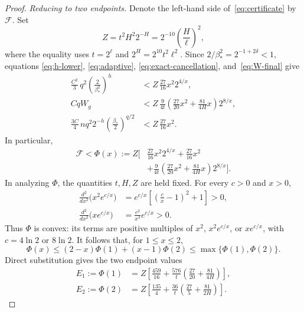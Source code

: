 \documentclass[11pt,a4paper]{article}
\begin{document}
\begin{proof}
\emph{Reducing to two endpoints.}
Denote the left-hand side of~\eqref{eq:certificate} by $\mathcal F$.
Set
\begin{equation}\label{eq:Z}
 Z=t^2H^2 2^{-H}
   =2^{-10}\left(\frac H\ell\right)^2,
\end{equation}
where the equality uses $t=2^\ell$ and
$2^H=2^{10}t^2\ell^2$.
Since $2/\beta_*^2=2^{-1+2\delta}<1$, equations
\eqref{eq:h-lower}, \eqref{eq:adaptive},
\eqref{eq:exact-cancellation}, and~\eqref{eq:W-final} give
\begin{align*}
 \frac{C^2}{3}\,q^2\left(\frac2{\beta_*^2}\right)^h
 &<Z\,\frac{27}{16}x^2 2^{4/x},\\
 CqW_g
 &<Z\,\frac9{4t}
      \left(\frac{27}{20}x^2+\frac{81}{4H}x\right)2^{8/x},\\
 \frac{3C}{4}\,nq^2 2^{-h}
       \left(\frac{\beta_*}{2}\right)^{q/2}
 &<Z\,\frac{27}{16}x^2.
\end{align*}
In particular,
\begin{equation}\label{eq:Phi}
 \begin{split}
 \mathcal F<\Phi(x):=Z\biggl[
 &\frac{27}{16}x^2 2^{4/x}+\frac{27}{16}x^2\\
 &+\frac9{4t}
   \left(\frac{27}{20}x^2+\frac{81}{4H}x\right)2^{8/x}
 \biggr].
 \end{split}
\end{equation}
In analyzing $\Phi$, the quantities $t,H,Z$ are held fixed.
For every $c>0$ and $x>0$,
\begin{equation}\label{eq:convexity}
 \begin{aligned}
 \frac{d^2}{dx^2}\bigl(x^2e^{c/x}\bigr)
 &=e^{c/x}\left[\left(\frac cx-1\right)^2+1\right]>0,\\
 \frac{d^2}{dx^2}\bigl(xe^{c/x}\bigr)
 &=\frac{c^2}{x^3}e^{c/x}>0.
 \end{aligned}
\end{equation}
Thus $\Phi$ is convex: its terms are positive multiples of $x^2$,
$x^2e^{c/x}$, or $xe^{c/x}$, with $c=4\ln2$ or $8\ln2$.
It follows that, for $1\le x\le2$,
\[
 \Phi(x)\le(2-x)\Phi(1)+(x-1)\Phi(2)
 \le\max\{\Phi(1),\Phi(2)\}.
\]
Direct substitution gives the two endpoint values
\begin{equation}\label{eq:endpoints}
 \begin{aligned}
 E_1:=\Phi(1)
 &=Z\left[\frac{459}{16}
       +\frac{576}{t}\left(\frac{27}{20}+\frac{81}{4H}\right)\right],\\
 E_2:=\Phi(2)
 &=Z\left[\frac{135}{4}
       +\frac{36}{t}\left(\frac{27}{5}+\frac{81}{2H}\right)\right].
 \end{aligned}
\end{equation}


\end{proof}
\end{document}
